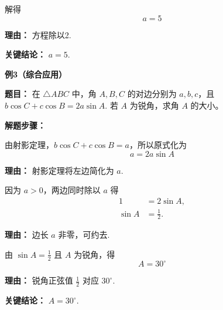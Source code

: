 \begin{examplebox}
\begin{description}[style=nextline, leftmargin=2.8em, labelsep=0.5em, itemsep=0.45em]
		\item[\textbf{第三步（解出 $a$）：}] 解得
			\[
				a = 5
			\]
			\par\textbf{理由：} 方程除以2.
	\end{description}

	\textbf{\textcolor{CExample}{关键结论：}}
	$a = 5$.

	\medskip
	\textbf{\textcolor{CExample}{例3（综合应用）}}

	\textbf{\textcolor{CExample}{题目：}}
	在 $\triangle ABC$ 中，角 $A,B,C$ 的对边分别为 $a,b,c$，且 $b\cos C + c\cos B = 2a\sin A$. 若 $A$ 为锐角，求角 $A$ 的大小。

	\textbf{\textcolor{CExample}{解题步骤：}}
	\begin{description}[style=nextline, leftmargin=2.8em, labelsep=0.5em, itemsep=0.45em]
		\item[\textbf{第一步（代换左边）：}] 由射影定理，$b\cos C + c\cos B = a$，所以原式化为
			\[
				a = 2a\sin A
			\]
			\par\textbf{理由：} 射影定理将左边简化为 $a$.

		\item[\textbf{第二步（整理方程）：}] 因为 $a > 0$，两边同时除以 $a$ 得
			\[
				\begin{aligned}
					1 &= 2\sin A, \\
					\sin A &= \frac12.
			\end{aligned}
			\]
			\par\textbf{理由：} 边长 $a$ 非零，可约去.

		\item[\textbf{第三步（求角 $A$）：}] 由 $\sin A = \frac12$ 且 $A$ 为锐角，得
			\[
				A = 30^\circ
			\]
			\par\textbf{理由：} 锐角正弦值 $\frac12$ 对应 $30^\circ$.
	\end{description}

	\textbf{\textcolor{CExample}{关键结论：}}
	$A = 30^\circ$.

\end{examplebox}
